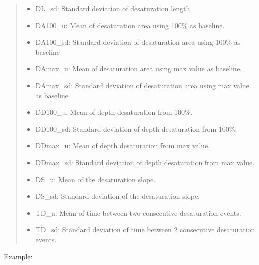 \documentclass[letterpaper,10pt,english]{sphinxmanual}
\begin{document}
\begin{fulllineitems}
\begin{fulllineitems}
\begin{quote}
\begin{description}
\begin{description}
\begin{itemize}
\item {} 
DL\_sd: Standard deviation of desaturation length

\item {} 
DA100\_u: Mean of desaturation area using 100\% as baseline.

\item {} 
DA100\_sd: Standard deviation of desaturation area using 100\% as baseline

\item {} 
DAmax\_u: Mean of desaturation area using max value as baseline.

\item {} 
DAmax\_sd: Standard deviation of desaturation area using max value as baseline

\item {} 
DD100\_u: Mean of depth desaturation from 100\%.

\item {} 
DD100\_sd: Standard deviation of depth desaturation from 100\%.

\item {} 
DDmax\_u: Mean of depth desaturation from max value.

\item {} 
DDmax\_sd: Standard deviation of depth desaturation from max value.

\item {} 
DS\_u: Mean of the desaturation slope.

\item {} 
DS\_sd: Standard deviation of the desaturation slope.

\item {} 
TD\_u: Mean of time between two consecutive desaturation events.

\item {} 
TD\_sd: Standard deviation of time between 2 consecutive desaturation events.

\end{itemize}

\end{description}


\end{description}\end{quote}

Example:

\begin{sphinxVerbatim}[commandchars=\\\{\}]
   


\end{sphinxVerbatim}
\end{fulllineitems}
\end{fulllineitems}
\end{document}
